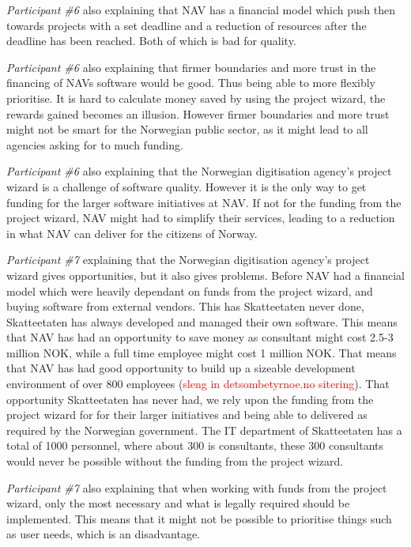 \textit{Participant \#6} also explaining that NAV has a financial model which push then towards projects with a set deadline and a reduction of resources after the deadline has been reached. Both of which is bad for quality.

\textit{Participant \#6} also explaining that firmer boundaries and more trust in the financing of NAVs software would be good. Thus being able to more flexibly prioritise. It is hard to calculate money saved by using the project wizard, the rewards gained becomes an illusion. However firmer boundaries and more trust might not be smart for the Norwegian public sector, as it might lead to all agencies asking for to much funding.

\textit{Participant \#6} also explaining that the Norwegian digitisation agency's project wizard is a challenge of software quality. However it is the only way to get funding for the larger software initiatives at NAV. If not for the funding from the project wizard, NAV might had to simplify their services, leading to a reduction in what NAV can deliver for the citizens of Norway.

\textit{Participant \#7} explaining that the Norwegian digitisation agency's project wizard gives opportunities, but it also gives problems. Before NAV had a financial model which were heavily dependant on funds from the project wizard, and buying software from external vendors. This has Skatteetaten never done, Skatteetaten has always developed and managed their own software. This means that NAV has had an opportunity to save money as consultant might cost 2.5-3 million NOK, while a full time employee might cost 1 million NOK. That means that NAV has had good opportunity to build up a sizeable development environment of over 800 employees (\textcolor{red}{sleng in detsombetyrnoe.no sitering}). That opportunity Skatteetaten has never had, we rely upon the funding from the project wizard for for their larger initiatives and being able to delivered as required by the Norwegian government. The IT department of Skatteetaten has a total of 1000 personnel, where about 300 is consultants, these 300 consultants would never be possible without the funding from the project wizard.

\textit{Participant \#7} also explaining that when working with funds from the project wizard, only the most necessary and what is legally required should be implemented. This means that it might not be possible to prioritise things such as user needs, which is an disadvantage.

